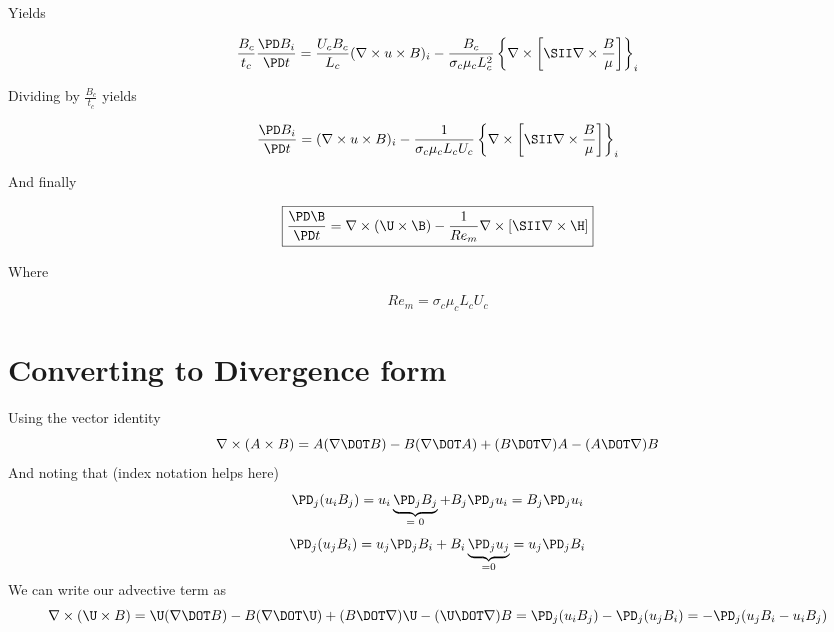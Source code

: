 \documentclass[11pt]{article}
\begin{document}
Yields

\begin{equation}
	\frac{B_c}{t_c}
	\frac{\PD B_i}{\PD t}
	=
	\frac{U_c B_c}{L_c}
	(\nabla \times u \times B)_i
	-
	\frac{B_c}{\sigma_c \mu_c L_c^2}
	\left\{
	\nabla \times
	\left[ \SII
	\nabla \times \frac{B}{\mu} \right]
	\right\}_i
\end{equation}

Dividing by $\frac{B_c}{t_c}$ yields

\begin{equation}
	\frac{\PD B_i}{\PD t}
	=
	(\nabla \times u \times B)_i
	-
	\frac{1}{\sigma_c \mu_c L_c U_c}
	\left\{
	\nabla \times
	\left[ \SII
	\nabla \times \frac{B}{\mu} \right]
	\right\}_i
\end{equation}

And finally

\begin{equation}
	\boxed{
	\frac{\PD \B}{\PD t} =
	\nabla \times (\U \times \B)
	-
	\frac{1}{Re_m}
	\nabla \times
	\left[ \SII
	\nabla \times \H \right]
	}
\end{equation}

Where

\begin{equation}
	Re_m = \sigma_c \mu_c L_c U_c
\end{equation}


\section{Converting to Divergence form}

Using the vector identity
\begin{equation}
	\nabla \times (A\times B) =
	A(\nabla \DOT B)
	- B(\nabla \DOT A)
	+(B \DOT \nabla)A - (A \DOT \nabla)B
\end{equation}
And noting that (index notation helps here)
\begin{equation}
	\PD_j (u_i B_j) =
	u_i \underbrace{\PD_j B_j}_\text{= 0} + B_j \PD_j u_i
	= B_j \PD_j u_i
\end{equation}
\begin{equation}
	\PD_j (u_j B_i) =
	u_j \PD_j B_i + B_i \underbrace{\PD_j u_j}_\text{=0}
	= u_j \PD_j B_i
\end{equation}
We can write our advective term as
\begin{equation}
	\nabla \times (\U \times B)
	= \U(\nabla \DOT B)
	- B(\nabla \DOT \U)
	+ (B \DOT \nabla)\U
	- (\U \DOT \nabla)B
	=
	\PD_j (u_i B_j) - \PD_j (u_j B_i)
	=
	-\PD_j (u_j B_i - u_i B_j)
\end{equation}
\end{document}

